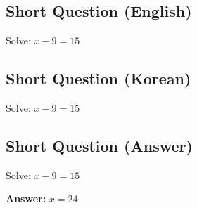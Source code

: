 \cleardoublepage
\subsection*{Short Question (English)}
Solve: $x - 9 = 15$


\newpage
\subsection*{Short Question (Korean)}
Solve: $x - 9 = 15$


\newpage
\subsection*{Short Question (Answer)}
Solve: $x - 9 = 15$

\textbf{Answer:} $x = 24$
